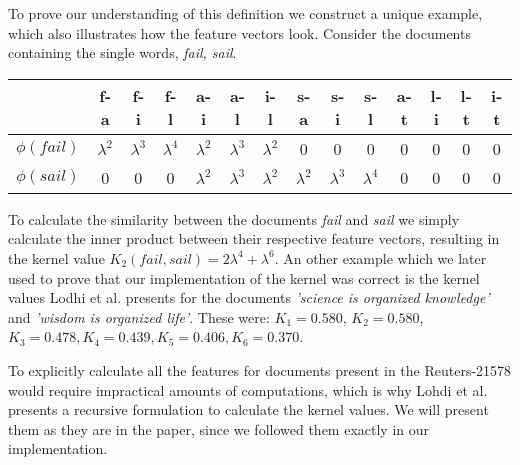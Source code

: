 To prove our understanding of this definition we construct a unique example, which also illustrates how the feature vectors look. Consider the documents containing the single words, \textit{fail, sail}.

\vspace{10pt}
\begin{centering}
\begin{tabular}{|c|c|c|c|c|c|c|c|c|c|c|c|c|c|}
	\hline 
	& f-a & f-i & f-l & a-i & a-l & i-l & s-a & s-i & s-l & a-t & l-i & l-t & i-t \\ 
	\hline 
	$\phi(fail)$ & $ \lambda^2 $ & $ \lambda^3 $ &$ \lambda^4 $  &  $ \lambda^2 $& $ \lambda^3 $  & $ \lambda^2 $ & 0 & 0 & 0 & 0 & 0 & 0 & 0 \\ 
	\hline 
	$\phi(sail)$ & 0 & 0 & 0 & $\lambda^2$ & $\lambda^3$ & $\lambda^2$ & $\lambda^2$ & $\lambda^3$ & $\lambda^4$ & 0 & 0 & 0 & 0 \\ 
	\hline 

\end{tabular} 
\end{centering}

\vspace{10pt}
To calculate the similarity between the documents \textit{fail} and \textit{sail} we simply calculate the inner product between their respective feature vectors, resulting in the kernel value $ K_2(fail,sail)  = 2\lambda^4 + \lambda^6 $. An other example which we later used to prove that our implementation of the kernel was correct is the kernel values Lodhi et al. presents for the documents \textit{'science is organized knowledge'} and \textit{'wisdom is organized life'}. These were: $ K_1 = 0.580 $, $ K_2 = 0.580$, $ K_3 = 0.478, K_4=0.439, K_5 = 0.406, K_6 = 0.370 $.

To explicitly calculate all the features for documents present in the Reuters-21578 would require impractical amounts of computations, which is why Lohdi et al. presents a recursive formulation to calculate the kernel values. We will present them as they are in the paper, since we followed them exactly in our implementation. 

